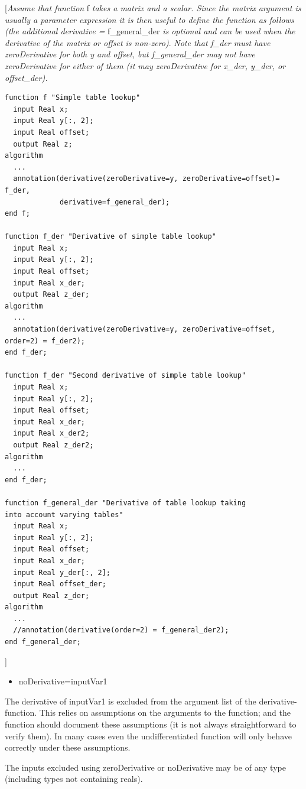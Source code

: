 \documentclass[10pt,a4paper]{report}
\begin{document}
{[}\emph{Assume that function} f \emph{takes a matrix and a scalar.
Since the matrix argument is usually a parameter expression it is then
useful to define the function as follows (the additional derivative =}
f\_general\_der \emph{is optional and can be used when the derivative of
the matrix or offset is non-zero)}. \emph{Note that f\_der must have
zeroDerivative for both y and offset, but f\_general\_der may not have
zeroDerivative for either of them (it may zeroDerivative for x\_der,
y\_der, or offset\_der).}

\begin{lstlisting}[language=modelica]
function f "Simple table lookup"
  input Real x;
  input Real y[:, 2];
  input Real offset;
  output Real z;
algorithm
  ...
  annotation(derivative(zeroDerivative=y, zeroDerivative=offset)= f_der,
             derivative=f_general_der);
end f;

function f_der "Derivative of simple table lookup"
  input Real x;
  input Real y[:, 2];
  input Real offset;
  input Real x_der;
  output Real z_der;
algorithm
  ...
  annotation(derivative(zeroDerivative=y, zeroDerivative=offset, order=2) = f_der2);
end f_der;

function f_der "Second derivative of simple table lookup"
  input Real x;
  input Real y[:, 2];
  input Real offset;
  input Real x_der;
  input Real x_der2;
  output Real z_der2;
algorithm
  ...
end f_der;

function f_general_der "Derivative of table lookup taking
into account varying tables"
  input Real x;
  input Real y[:, 2];
  input Real offset;
  input Real x_der;
  input Real y_der[:, 2];
  input Real offset_der;
  output Real z_der;
algorithm
  ...
  //annotation(derivative(order=2) = f_general_der2);
end f_general_der;
\end{lstlisting}
{]}

\begin{itemize}
\item
  noDerivative=inputVar1
\end{itemize}

The derivative of inputVar1 is excluded from the argument list of the
derivative-function. This relies on assumptions on the arguments to the
function; and the function should document these assumptions (it is not
always straightforward to verify them). In many cases even the
undifferentiated function will only behave correctly under these
assumptions.

The inputs excluded using zeroDerivative or noDerivative may be of any
type (including types not containing reals).
\end{document}
